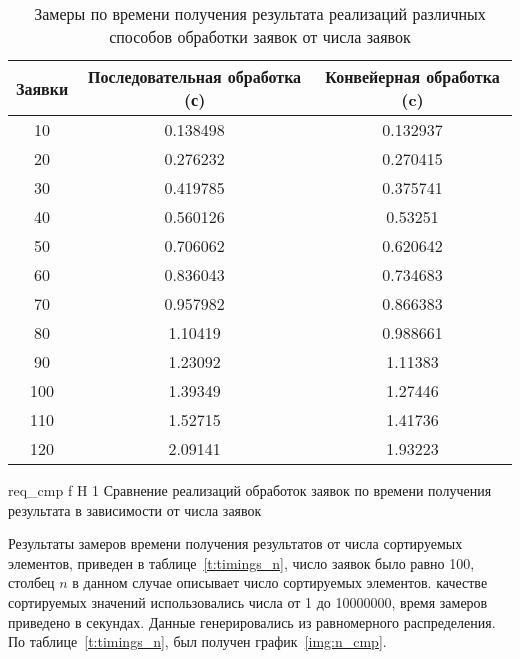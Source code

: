 \begin{table}[H]
	\centering
	\caption{Замеры по времени получения результата реализаций различных способов обработки заявок от числа заявок}
	\begin{tabular}{|c|c|c|}
		\hline
		Заявки & Последовательная обработка (с) & Конвейерная обработка (c) \\ \hline
		10     & 0.138498                       & 0.132937              \\ \hline
		20     & 0.276232                       & 0.270415              \\ \hline
		30     & 0.419785                       & 0.375741              \\ \hline
		40     & 0.560126                       & 0.53251               \\ \hline
		50     & 0.706062                       & 0.620642              \\ \hline
		60     & 0.836043                       & 0.734683              \\ \hline
		70     & 0.957982                       & 0.866383              \\ \hline
		80     & 1.10419                        & 0.988661              \\ \hline
		90     & 1.23092                        & 1.11383               \\ \hline
		100    & 1.39349                        & 1.27446               \\ \hline
		110    & 1.52715                        & 1.41736               \\ \hline
		120    & 2.09141                        & 1.93223               \\ \hline
	\end{tabular}
	\label{t:timings_req}
\end{table}

{req_cmp} %
{f} %
{H} %
{1\textwidth} %
{Сравнение реализаций обработок заявок по времени получения результата в зависимости от числа заявок} %

Результаты замеров времени получения результатов от числа сортируемых элементов, приведен в таблице~\ref{t:timings_n}, число заявок было равно 100, столбец $n$ в данном случае описывает число сортируемых элементов. качестве сортируемых значений использовались  числа от 1 до 10000000, время замеров приведено в секундах. Данные генерировались из равномерного распределения. По таблице~\ref{t:timings_n}, был получен график~\ref{img:n_cmp}.

